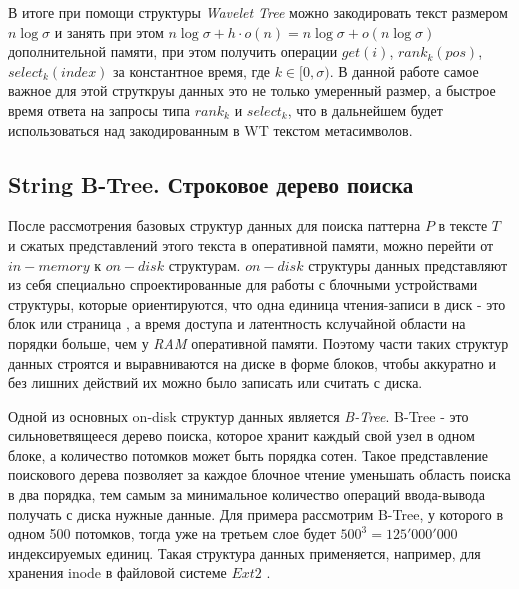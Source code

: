 \documentclass[a4paper,12pt]{article}
\begin{document}
В итоге при помощи структуры \textit{Wavelet Tree} можно закодировать текст размером $n \log{\sigma}$ и занять при этом $n \log \sigma + h \cdot o(n) = n \log \sigma + o(n\log\sigma)$ дополнительной памяти, при этом получить операции $get(i)$, $rank_k(pos)$, $select_k(index)$ за константное время, где $k \in [0, \sigma)$. В данной работе самое важное для этой струткруы данных это не только умеренный размер, а быстрое время ответа на запросы типа $rank_k$ и $select_k$, что в дальнейшем будет использоваться над закодированным в WT текстом метасимволов.

\subsection{String B-Tree. Строковое дерево поиска}
После рассмотрения базовых структур данных для поиска паттерна $P$ в тексте $T$ и сжатых представлений этого текста в оперативной памяти, можно перейти от $in-memory$ к $on-disk$ структурам. $on-disk$ структуры данных представляют из себя специально спроектированные для работы с блочными устройствами \cite{cobb2012nvm} структуры, которые ориентируются, что одна единица чтения-записи в диск - это блок или страница \cite{agrawal2008design}, а время доступа и латентность кслучайной области на порядки больше, чем у \textit{RAM} оперативной памяти\cite{koo20121}. Поэтому части таких структур данных строятся и выравниваются на диске в форме блоков, чтобы аккуратно и без лишних действий их можно было записать или считать с диска.

Одной из основных on-disk структур данных является \textit{B-Tree}. B-Tree - это сильноветвящееся дерево поиска, которое хранит каждый свой узел в одном блоке, а количество потомков может быть порядка сотен. Такое представление поискового дерева позволяет за каждое блочное чтение уменьшать область поиска в два порядка, тем самым за минимальное количество операций ввода-вывода получать с диска нужные данные. Для примера рассмотрим B-Tree, у которого в одном 500 потомков, тогда уже на третьем слое будет $500^3 = 125'000'000$ индексируемых единиц. Такая структура данных применяется, например, для хранения inode в файловой системе $Ext2$ \cite{phillips2001directory}.
\end{document}
